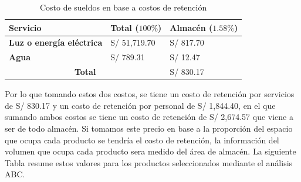 \begin{itemize}
\begin{table}[H]
    \caption{Costo de sueldos en base a costos de retención}
    \begin{tabular}{p{4cm} p{4cm} p{4cm}}
        \hline
        \textbf{Servicio} & \textbf{Total ($100\%$)} & \textbf{Almacén ($1.58\%$)} \\
        \hline
        \textbf{Luz o energía eléctrica} & S/ 51,719.70 & S/ 817.70 \\
        \textbf{Agua} & S/ 789.31 & S/ 12.47 \\
        \hline
        \multicolumn{2}{c}{\textbf{Total}} & S/ 830.17
    \end{tabular}
    \label{table:Servicio_costo_retencion}
\end{table}

\end{itemize}

Por lo que tomando estos dos costos, se tiene un costo de retención por servicios de S/ 830.17 y un costo de retención por personal de S/ 1,844.40, en el que sumando ambos costos se tiene un costo de retención de S/ 2,674.57 que viene a ser de todo almacén. Si tomamos este precio en base a la proporción del espacio que ocupa cada producto se tendría el costo de retención, la información del volumen que ocupa cada producto sera medido del área de almacén. La siguiente Tabla resume estos valores para los productos seleccionados mediante el análisis ABC.

